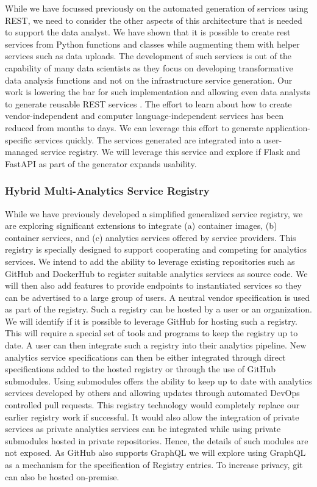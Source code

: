 While we have focussed previously on the automated generation of
services using REST, we need to consider the other aspects of this
architecture that is needed to support the data analyst.  We have
shown that it is possible to create rest services from Python
functions and classes while augmenting them with helper services such
as data uploads. The development of such services is out of the
capability of many data scientists as they focus on developing
transformative data analysis functions and not on the infrastructure
service generation. Our work is lowering the bar for such
implementation and allowing even data analysts to generate reusable
REST services \cite{las21openapi}. The effort to learn about how to
create vendor-independent and computer language-independent services
has been reduced from months to days. We can leverage this effort to
generate application-specific services quickly. The services generated
are integrated into a user-managed service registry. We will leverage
this service and explore if Flask and FastAPI as part
of the generator expands usability.

\subsubsection{Hybrid Multi-Analytics Service Registry}

While we have previously developed a simplified generalized service
registry, we are exploring significant extensions to integrate (a)
container images, (b) container services, and (c) analytics 
services offered by service providers. This registry is specially
designed to support cooperating and competing for analytics services.
We intend to add the ability to leverage existing repositories such as
GitHub and DockerHub to register suitable analytics services as source
code. We will then also add features to provide endpoints to
instantiated services so they can be advertised to a large group of
users.  A neutral vendor specification is used as part of the
registry. Such a registry can be hosted by a user or an
organization. We will identify if it is possible to leverage GitHub
for hosting such a registry. This will require a special set of tools
and programs to keep the registry up to date. A user can then
integrate such a registry into their analytics pipeline. New analytics
service specifications can then be either integrated through direct
specifications added to the hosted registry or through the use of
GitHub submodules. Using submodules offers the ability to keep up to
date with analytics services developed by others and allowing updates
through automated DevOps controlled pull requests. This registry
technology would completely replace our earlier registry work if
successful. It would also allow the integration of private services as
private analytics services can be integrated while using private
submodules hosted in private repositories. Hence, the details of such
modules are not exposed. As GitHub also supports GraphQL we will
explore using GraphQL as a mechanism for the specification of Registry
entries. To increase privacy, git can also be hosted on-premise.

